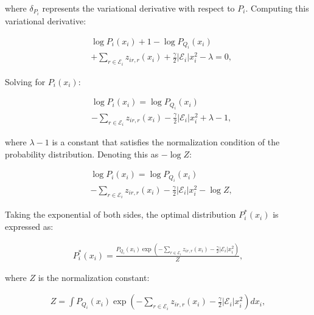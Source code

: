 \documentclass[a4paper,fleqn,10pt,twocolumn]{SICE_ISCS}
\begin{document}
where $\delta_{P_i}$ represents the variational derivative with respect to $P_i$. Computing this variational derivative:

\begin{equation}
\begin{aligned}
&\log P_i(x_i) + 1 - \log P_{Q_i}(x_i) \\
&+ \sum_{r \in {\mathcal{E}}_i} z_{ir,r}(x_i) 
+ \frac{\gamma}{2}|{\mathcal{E}}_i| x_i^2 - \lambda = 0,
\end{aligned}
\end{equation}

Solving for $P_i(x_i)$:

\begin{equation}
\begin{aligned}
&\log P_i(x_i) = \log P_{Q_i}(x_i) \\
&- \sum_{r \in {\mathcal{E}}_i} z_{ir,r}(x_i)
- \frac{\gamma}{2}|{\mathcal{E}}_i| x_i^2 + \lambda - 1,
\end{aligned}
\end{equation}

where $\lambda-1$ is a constant that satisfies the normalization condition of the probability distribution. Denoting this as $-\log Z$:

\begin{equation}
\begin{aligned}
&\log P_i(x_i) = \log P_{Q_i}(x_i) \\
&- \sum_{r \in {\mathcal{E}}_i} z_{ir,r}(x_i)
- \frac{\gamma}{2}|{\mathcal{E}}_i| x_i^2 - \log Z,
\end{aligned}
\end{equation}

Taking the exponential of both sides, the optimal distribution $P_i^*(x_i)$ is expressed as:

\begin{equation}
\begin{aligned}
P_i^*(x_i) = \frac{P_{Q_i}(x_i)\exp\left(- \sum_{r \in {\mathcal{E}}_i} z_{ir,r}(x_i) 
- \frac{\gamma}{2}|{\mathcal{E}}_i| x_i^2\right)}{Z},
\end{aligned}
\end{equation}

where $Z$ is the normalization constant:

\begin{equation}
\begin{aligned}
Z = \int P_{Q_i}(x_i)\exp\left(- \sum_{r \in {\mathcal{E}}_i} z_{ir,r}(x_i) 
- \frac{\gamma}{2}|{\mathcal{E}}_i| x_i^2\right) dx_i,
\end{aligned}
\end{equation}
\end{document}
